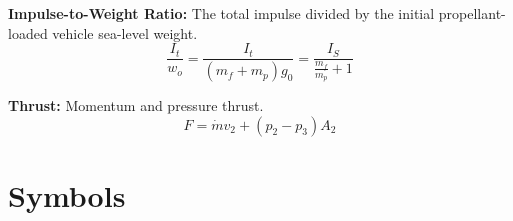 \documentclass[12pt]{article}
\begin{document}
\bigskip
\noindent
\textbf{Impulse-to-Weight Ratio:}
The total impulse divided by the initial propellant-loaded vehicle sea-level weight.
\begin{equation}
    \frac{I_t}{w_o} = \frac{I_t}{(m_f + m_p) g_0} = \frac{I_S}{\frac{m_f}{m_p} + 1}
\end{equation}

\bigskip
\noindent
\textbf{Thrust:}
Momentum and pressure thrust.
\begin{equation}
    F = \dot{m} v_2 + (p_2 - p_3) A_2
\end{equation}



\section*{Symbols}
\end{document}
